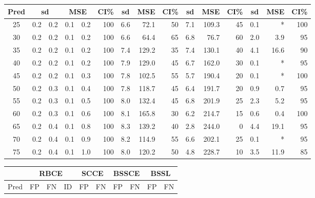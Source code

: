 \documentclass[preprint,12pt]{elsarticle}
\begin{document}
\begin{table}[ht]
\begin{tabular}{c|rrrrr|rrr|rrr|rrr}
		\hline
		\multicolumn{1}{c|}{Pred}&
		\multicolumn{2}{c}{sd}&
		\multicolumn{2}{c}{MSE}&
		\multicolumn{1}{c|}{CI\%}&
		\multicolumn{1}{c}{sd}&
		\multicolumn{1}{c}{MSE}&
		\multicolumn{1}{c|}{CI\%}&
		\multicolumn{1}{c}{sd}&
		\multicolumn{1}{c}{MSE}&
		\multicolumn{1}{c|}{CI\%}&
		\multicolumn{1}{c}{sd}&
		\multicolumn{1}{c}{MSE}&
		\multicolumn{1}{c}{CI\%}
		\\
		\hline
		25 & 0.2 & 0.2 & 0.1 & 0.2 & 100 & 6.6 & 72.1 & 50 & 7.1 & 109.3 & 45 & 0.1 & * & 100 \\ 
		30 & 0.2 & 0.2 & 0.1 & 0.2 & 100 & 6.6 & 64.4 & 65 & 6.8 & 76.7 & 60 & 2.0 & 3.9 & 95 \\ 
		35 & 0.2 & 0.2 & 0.1 & 0.2 & 100 & 7.4 & 129.2 & 35 & 7.4 & 130.1 & 40 & 4.1 & 16.6 & 90 \\ 
		40 & 0.2 & 0.2 & 0.1 & 0.2 & 100 & 7.9 & 129.0 & 45 & 6.7 & 162.0 & 30 & 0.1 & * & 95 \\ 
		45 & 0.2 & 0.2 & 0.1 & 0.3 & 100 & 7.8 & 102.5 & 55 & 5.7 & 190.4 & 20 & 0.1 & * & 100 \\ 
		50 & 0.2 & 0.3 & 0.1 & 0.4 & 100 & 7.8 & 118.7 & 45 & 6.4 & 191.7 & 20 & 0.9 & 0.7 & 95 \\ 
		55 & 0.2 & 0.3 & 0.1 & 0.5 & 100 & 8.0 & 132.4 & 45 & 6.8 & 201.9 & 25 & 2.3 & 5.2 & 95 \\ 
		60 & 0.2 & 0.3 & 0.1 & 0.6 & 100 & 8.1 & 165.8 & 30 & 6.2 & 214.7 & 15 & 0.6 & 0.4 & 100 \\ 
		65 & 0.2 & 0.4 & 0.1 & 0.8 & 100 & 8.3 & 139.2 & 40 & 2.8 & 244.0 & 0 & 4.4 & 19.1 & 95 \\ 
		70 & 0.2 & 0.4 & 0.1 & 0.9 & 100 & 8.2 & 114.9 & 55 & 6.6 & 202.1 & 25 & 0.1 & * & 95 \\ 
		75 & 0.2 & 0.4 & 0.1 & 1.0 & 100 & 8.0 & 120.2 & 50 & 4.8 & 228.7 & 10 & 3.5 & 11.9 & 85 \\ 
		\hline
	\end{tabular}
	\begin{tabular}{c|rrr|rr|rr|rr}
		\hline
		\multicolumn{1}{l|}{}&
		\multicolumn{3}{c|}{RBCE}&
		\multicolumn{2}{c|}{SCCE}&
		\multicolumn{2}{c|}{BSSCE}&
		\multicolumn{2}{c}{BSSL}\\
		\hline
		\multicolumn{1}{c|}{Pred}&
		\multicolumn{1}{c}{FP}&
		\multicolumn{1}{c}{FN}&
		\multicolumn{1}{c|}{ID}&
		\multicolumn{1}{c}{FP}&
		\multicolumn{1}{c|}{FN}&
		\multicolumn{1}{c}{FP}&
		\multicolumn{1}{c|}{FN}&
		\multicolumn{1}{c}{FP}&
		\multicolumn{1}{c}{FN}
		\\

\end{tabular}
\end{table}
\end{document}
